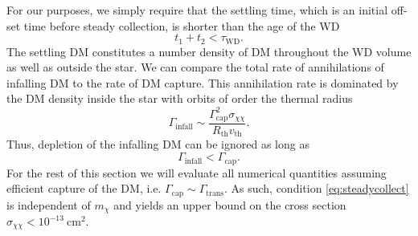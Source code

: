 \documentclass[preprintnumbers,amsmath,amssymb,prd,superscriptaddress]{revtex4}
\newcommand{\GeV}{\text{GeV}}
\def\r{\right)}
\def\l{\left(}
\begin{document}
For our purposes, we simply require that the settling time, which is an initial off-set time before steady collection, is shorter than the age of the WD
\begin{equation}
t_1 + t_2 < \tau_\text{WD}.
\end{equation}
The settling DM constitutes a number density of DM throughout the WD volume as well as outside the star. 
We can compare the total rate of annihilations of infalling DM to the rate of DM capture.  
This annihilation rate is dominated by the DM density inside the star with orbits of order the thermal radius
\begin{equation}
\label{eq:infallrate}
\Gamma_\text{infall} \sim \frac{\Gamma_\text{cap}^2 \sigma_{\chi \chi}}{R_\text{th} v_\text{th}}.
\end{equation}
Thus, depletion of the infalling DM can be ignored as long as
\begin{equation}
\label{eq:steadycollect}
\Gamma_\text{infall} < \Gamma_\text{cap}.
\end{equation}
For the rest of this section we will evaluate all numerical quantities assuming efficient capture of the DM, i.e. $\Gamma_\text{cap} \sim \Gamma_\text{trans}$. 
As such, condition \eqref{eq:steadycollect} is independent of $m_\chi$ and yields an upper bound on the cross section $\sigma_{\chi \chi} < 10^{-13} ~\text{cm}^2$. 
\end{document}
